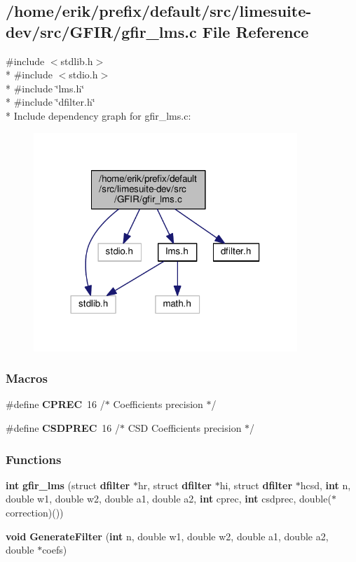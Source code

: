 \subsection{/home/erik/prefix/default/src/limesuite-\/dev/src/\+G\+F\+I\+R/gfir\+\_\+lms.c File Reference}
\label{gfir__lms_8c}
{\ttfamily \#include $<$stdlib.\+h$>$}\\*
{\ttfamily \#include $<$stdio.\+h$>$}\\*
{\ttfamily \#include \char`\"{}lms.\+h\char`\"{}}\\*
{\ttfamily \#include \char`\"{}dfilter.\+h\char`\"{}}\\*
Include dependency graph for gfir\+\_\+lms.\+c\+:
\nopagebreak
\begin{figure}[H]
\begin{center}
\leavevmode
\includegraphics[width=282pt]{da/d9e/gfir__lms_8c__incl}
\end{center}
\end{figure}
\subsubsection*{Macros}
\begin{DoxyCompactItemize}
\item 
\#define {\bf C\+P\+R\+EC}~16	/$\ast$ Coefficients precision $\ast$/
\item 
\#define {\bf C\+S\+D\+P\+R\+EC}~16	/$\ast$ C\+SD Coefficients precision $\ast$/
\end{DoxyCompactItemize}
\subsubsection*{Functions}
\begin{DoxyCompactItemize}
\item 
{\bf int} {\bf gfir\+\_\+lms} (struct {\bf dfilter} $\ast$hr, struct {\bf dfilter} $\ast$hi, struct {\bf dfilter} $\ast$hcsd, {\bf int} n, double w1, double w2, double a1, double a2, {\bf int} cprec, {\bf int} csdprec, double($\ast$correction)())
\item 
{\bf void} {\bf Generate\+Filter} ({\bf int} n, double w1, double w2, double a1, double a2, double $\ast$coefs)
\end{DoxyCompactItemize}


